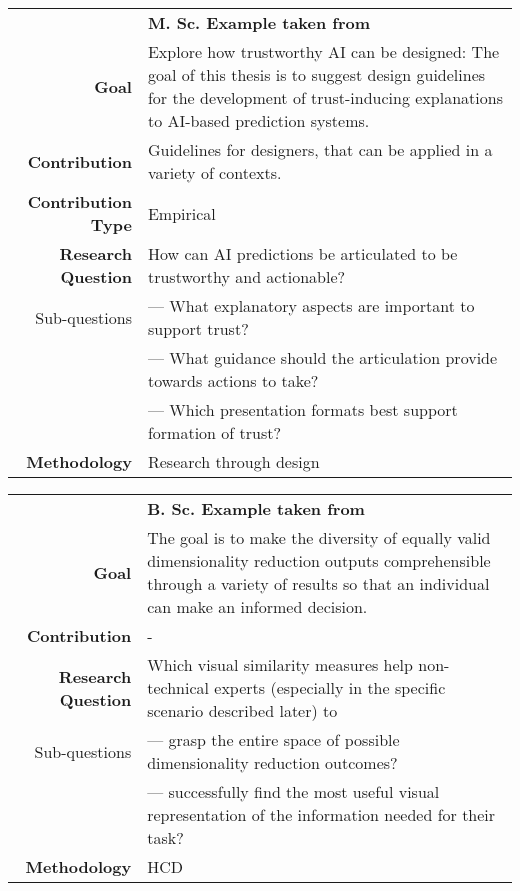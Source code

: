 \begin{table}[htb]
\small
\colorbox{usethiscolorhere}{
\centering
\begin{tabularx}{\textwidth}{@{} r Y @{}}
	&
	\textbf{M. Sc. Example taken from ~\cite{Uga1324610}}\vspace{2mm}\\
    \textbf{Goal} & Explore how trustworthy AI can be designed: The goal of this thesis is to suggest design guidelines for the development of trust-inducing explanations to AI-based prediction systems. \vspace{2mm}\\
	\textbf{Contribution} &	Guidelines for designers, that can be applied in a variety of contexts.\vspace{2mm}\\
	\textbf{Contribution Type} & Empirical \vspace{2mm}\\
    \textbf{Research Question} & How can AI predictions be articulated to be trustworthy and actionable?\\
    Sub-questions & --- What explanatory aspects are important to support trust?\\
    & --- What guidance should the articulation provide towards actions to take?\\
    & --- Which presentation formats best support formation of trust?\vspace{2mm}\\
	\textbf{Methodology} & Research through design \vspace{2mm}\\
\end{tabularx}
}
\end{table}

\begin{table}[htb]
\small
\colorbox{usethiscolorhere}{
\centering
\begin{tabularx}{\textwidth}{@{} r Y @{}}
	&
	\textbf{B. Sc. Example taken from~\cite{Joppien2020}}\vspace{2mm}\\
    \textbf{Goal}
    & The goal is to make the diversity of equally valid dimensionality reduction outputs comprehensible through a variety of results so that an individual can make an informed decision. \vspace{2mm}\\
	\textbf{Contribution}
	& -\vspace{2mm}\\
    \textbf{Research Question}
    & Which visual similarity measures help non-technical experts (especially
in the specific scenario described later) to\\
    Sub-questions
    & --- grasp the entire space of possible dimensionality reduction outcomes?\\
    & --- successfully find the most useful visual representation of the information needed for their task?\\
	\textbf{Methodology}
	& HCD\vspace{2mm}\\
\end{tabularx}
}
\end{table}